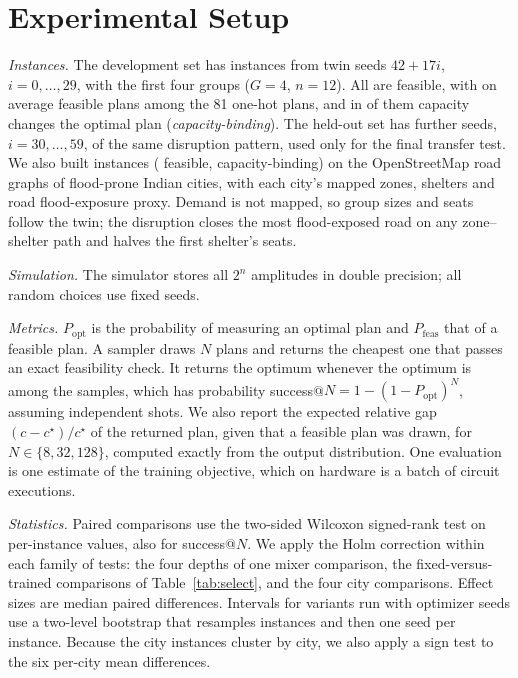 \documentclass[conference]{IEEEtran}
\begin{document}
\section{Experimental Setup}\label{sec:setup}
\textit{Instances.} The development set has \NInst{} instances from twin seeds $42+17i$, $i=0,\dots,29$, with the first four groups ($G=4$, $n=12$). All are feasible, with on average \MeanFeasAssign{} feasible plans among the 81 one-hot plans, and in \NBinding{} of them capacity changes the optimal plan (\emph{capacity-binding}). The held-out set has \HoN{} further seeds, $i=30,\dots,59$, of the same disruption pattern, used only for the final transfer test. We also built \CityAll{} instances (\CityN{} feasible, \CityBinding{} capacity-binding) on the OpenStreetMap road graphs of \CityNCities{} flood-prone Indian cities, with each city's mapped zones, shelters and road flood-exposure proxy. Demand is not mapped, so group sizes and seats follow the twin; the disruption closes the most flood-exposed road on any zone--shelter path and halves the first shelter's seats.

\textit{Simulation.} The simulator stores all $2^n$ amplitudes in double precision; all random choices use fixed seeds.

\textit{Metrics.} $P_{\mathrm{opt}}$ is the probability of measuring an optimal plan and $P_{\mathrm{feas}}$ that of a feasible plan. A sampler draws $N$ plans and returns the cheapest one that passes an exact feasibility check. It returns the optimum whenever the optimum is among the samples, which has probability success@$N=1-(1-P_{\mathrm{opt}})^N$, assuming independent shots. We also report the expected relative gap $(c-c^\star)/c^\star$ of the returned plan, given that a feasible plan was drawn, for $N\in\{8,32,128\}$, computed exactly from the output distribution. One evaluation is one estimate of the training objective, which on hardware is a batch of circuit executions.

\textit{Statistics.} Paired comparisons use the two-sided Wilcoxon signed-rank test on per-instance values, also for success@$N$. We apply the Holm correction within each family of tests: the four depths of one mixer comparison, the \SelFamily{} fixed-versus-trained comparisons of Table~\ref{tab:select}, and the four city comparisons. Effect sizes are median paired differences. Intervals for variants run with \NSeeds{} optimizer seeds use a two-level bootstrap that resamples instances and then one seed per instance. Because the city instances cluster by city, we also apply a sign test to the six per-city mean differences.
\end{document}
